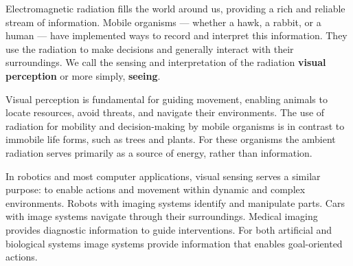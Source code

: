\documentclass[
  letterpaper,
]{book}
\begin{document}
Electromagnetic radiation fills the world around us, providing a rich
and reliable stream of information. Mobile organisms --- whether a hawk,
a rabbit, or a human --- have implemented ways to record and interpret
this information. They use the radiation to make decisions and generally
interact with their surroundings. We call the sensing and interpretation
of the radiation \textbf{visual perception} or more simply,
\textbf{seeing}.

Visual perception is fundamental for guiding movement, enabling animals
to locate resources, avoid threats, and navigate their environments. The
use of radiation for mobility and decision-making by mobile organisms is
in contrast to immobile life forms, such as trees and plants. For these
organisms the ambient radiation serves primarily as a source of energy,
rather than information.

In robotics and most computer applications, visual sensing serves a
similar purpose: to enable actions and movement within dynamic and
complex environments. Robots with imaging systems identify and
manipulate parts. Cars with image systems navigate through their
surroundings. Medical imaging provides diagnostic information to guide
interventions. For both artificial and biological systems image systems
provide information that enables goal-oriented actions.
\end{document}
